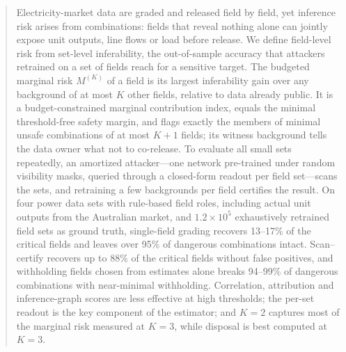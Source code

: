 \begin{abstract}
Electricity-market data are graded and released field by field, yet inference risk arises from
combinations: fields that reveal nothing alone can jointly expose unit outputs, line flows or load
before release. We define field-level risk from set-level inferability, the out-of-sample accuracy
that attackers retrained on a set of fields reach for a sensitive target. The budgeted marginal risk
$M^{(K)}$ of a field is its largest inferability gain over any background of at most $K$ other
fields, relative to data already public. It is a budget-constrained marginal contribution index,
equals the minimal threshold-free safety margin, and flags exactly the members of minimal unsafe
combinations of at most $K+1$ fields; its witness background tells the data owner what not to
co-release. To evaluate all small sets repeatedly, an amortized attacker---one network pre-trained
under random visibility masks, queried through a closed-form readout per field set---scans the
sets, and retraining a few backgrounds per field certifies the result. On four power data sets with
rule-based field roles, including actual unit outputs from the Australian market, and
$1.2\times10^5$ exhaustively retrained field sets as ground truth, single-field grading recovers
13--17\% of the critical fields
and leaves over 95\% of dangerous combinations intact. Scan--certify recovers up to 88\% of the
critical fields without false positives, and withholding fields chosen from estimates alone breaks
94--99\% of dangerous combinations with near-minimal withholding. Correlation, attribution and
inference-graph scores are less effective at high thresholds; the per-set readout is the key
component of the estimator; and $K=2$ captures most of the marginal risk measured at $K=3$, while
disposal is best computed at $K=3$.
\end{abstract}
